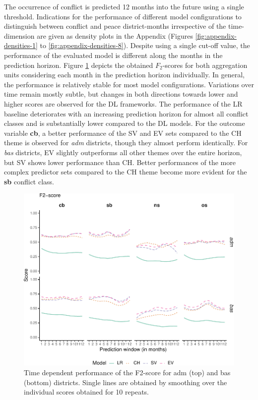 \documentclass[a4paper,11pt]{article}
\begin{document}
The occurrence of conflict is predicted 12 months into the future using a
single threshold. Indications for the performance of different model configurations
to distinguish between conflict and peace district-months irrespective of the
time-dimension are given as density plots in the Appendix
(Figures \ref{fig:appendix-densities-1} to \ref{fig:appendix-densities-8}).
Despite using a single cut-off value, the performance of the evaluated model
is different along the months in the prediction horizon. Figure
\ref{fig:04-results-time-f2} depicts the obtained \(F_2\)-scores for both
aggregation units considering each month in the prediction horizon individually.
In general, the performance is relatively stable for most model configurations.
Variations over time remain mostly subtle, but changes in both directions
towards lower and higher scores are observed for the DL frameworks. The performance
of the LR baseline deteriorates with an increasing prediction horizon
for almost all conflict classes and is substantially lower compared to the DL models.
For the outcome variable \textbf{cb}, a better performance of the SV and EV sets compared
to the CH theme is observed for \emph{adm} districts, though they almost perform identically.
For \emph{bas} districts, EV slightly outperforms all other themes over the entire
horizon, but SV shows lower performance than CH. Better performances of the more
complex predictor sets compared to the CH theme become more evident for the \textbf{sb}
conflict class.
\begin{figure}[H]

{\centering \includegraphics{thesis_files/figure-latex/04-results-time-f2-1} 

}

\caption[Time dependent performance of the F2-score.]{Time dependent performance of the F2-score for adm (top) and bas (bottom) districts. Single lines are obtained by smoothing over the individual scores obtained for 10 repeats.}\label{fig:04-results-time-f2}
\end{figure}
\end{document}
